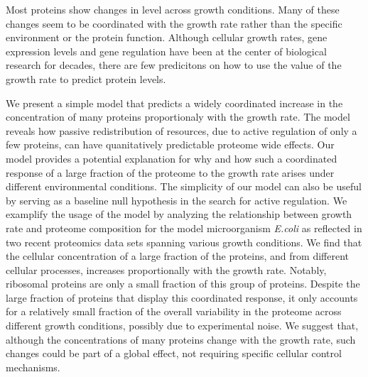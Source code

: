 Most proteins show changes in level across growth conditions.
Many of these changes seem to be coordinated with the growth rate rather than the specific environment or the protein function.
Although cellular growth rates, gene expression levels and gene regulation have been at the center of biological research for decades, there are few predicitons on how to use the value of the growth rate to predict protein levels. 

We present a simple model that predicts a widely coordinated increase in the concentration of many proteins proportionaly with the growth rate. The model reveals how passive redistribution of resources, due to active regulation of only a few proteins, can have quanitatively predictable proteome wide effects.
Our model provides a potential explanation for why and how such a coordinated response of a large fraction of the proteome to the growth rate arises under different environmental conditions.
The simplicity of our model can also be useful by serving as a baseline null hypothesis in the search for active regulation.
We examplify the usage of the model by analyzing the relationship between growth rate and proteome composition for the model microorganism \emph{E.coli} as reflected in two recent proteomics data sets spanning various growth conditions.
We find that the cellular concentration of a large fraction of the proteins, and from different cellular processes, increases proportionally with the growth rate. Notably, ribosomal proteins are only a small fraction of this group of proteins.
Despite the large fraction of proteins that display this coordinated response, it only accounts for a relatively small fraction of the overall variability in the proteome across different growth conditions, possibly due to experimental noise.
We suggest that, although the concentrations of many proteins change with the growth rate, such changes could be part of a global effect, not requiring specific cellular control mechanisms.